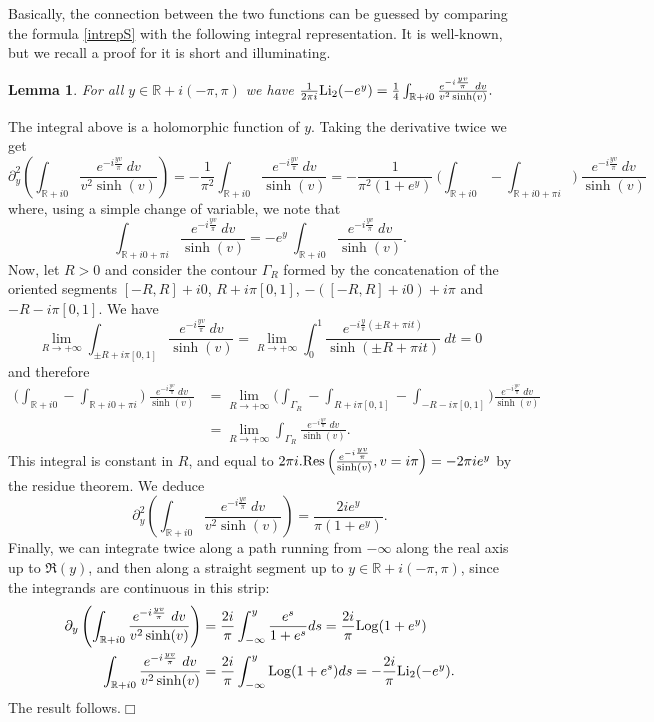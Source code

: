 \documentclass[11pt]{amsart}
\newtheorem{lem}[teo]{Lemma}
\newcommand{\cvd}{\hfill$\Box$}
\newcommand{\mr}{\mathbb{R}}
\newcommand{\Log}{{\rm Log}}
\def\cvd{\hfill$\Box$}
\begin{document}
{\begin{equation}
\end{equation}
Basically, the connection between the two functions can be guessed by comparing the formula \eqref{intrepS} with the following integral representation. It is well-known, but we recall a proof for it is short and illuminating.
\begin{lem}\label{Li2intrep} For all $y\in \mr+i(-\pi,\pi)$ we have $\frac{1}{2\pi i}{\rm Li_2}(-e^y) = \frac{1}{4} \int_{\mr +i0} \frac{e^{-i\frac{yv}{\pi}}\ dv}{v^2\sinh(v)}.$
\end{lem}
\proof The integral above is a holomorphic function of $y$. Taking the derivative twice we get
$$\partial_{y}^2 \left( \int_{\mr +i0} \frac{e^{-i\frac{yv}{\pi}}\ dv}{v^2\sinh(v)}\right)  = -\frac{1}{\pi^2} \int_{\mr +i0} \frac{e^{-i\frac{yv}{\pi}}\ dv}{\sinh(v)} = -\frac{1}{\pi^2 (1+e^{y})}\ \biggl( \int_{\mr +i0} - \int_{\mr +i0+\pi i} \biggr)\ \frac{e^{-i\frac{yv}{\pi}}\ dv}{\sinh(v)}$$
where, using a simple change of variable, we note that
$$\int_{\mr +i0+\pi i} \frac{e^{-i\frac{yv}{\pi}}\ dv}{\sinh(v)} = -e^{y}\ \int_{\mr +i0} \frac{e^{-i\frac{yv}{\pi}}\ dv}{\sinh(v)}.$$
Now, let $R>0$ and consider the contour $\Gamma_R$ formed by the concatenation of the oriented segments $[-R,R]+i0$, $R+i\pi[0,1]$, $-([-R,R]+i0)+i\pi$ and $-R-i\pi [0,1]$. We have
$$\lim_{R \rightarrow +\infty} \int_{\pm R+i\pi[0,1]} \frac{e^{-i\frac{yv}{\pi}}\ dv}{\sinh(v)} = \lim_{R \rightarrow +\infty} \int_0^1 \frac{e^{-i\frac{y}{\pi}(\pm R + \pi it)}}{\sinh(\pm R + \pi it)} \ dt = 0$$
and therefore
\begin{align*}\biggl( \int_{\mr +i0} - \int_{\mr +i0+\pi i} \biggr)\ \frac{e^{-i\frac{yv}{\pi}}\ dv}{\sinh(v)} & = \lim_{R \rightarrow +\infty} \biggl( \int_{\Gamma_R} - \int_{R+i\pi[0,1]} - \int_{-R-i\pi[0,1]}\biggr) \frac{e^{-i\frac{yv}{\pi}}\ dv}{\sinh(v)} \\ & = \lim_{R \rightarrow +\infty} \int_{\Gamma_R} \frac{e^{-i\frac{yv}{\pi}}\ dv}{\sinh(v)}. 
\end{align*}
This integral is constant in $R$, and equal to $\textstyle 2\pi i .{\rm Res}\left( \frac{e^{-i\frac{yv}{\pi}}}{\sinh(v)}, v=i\pi\right) =-2\pi i e^y$ by the residue theorem. We deduce
$$\partial_{y}^2 \left( \int_{\mr +i0} \frac{e^{-i\frac{yv}{\pi}}\ dv}{v^2\sinh(v)}\right) =\frac{2ie^y}{\pi (1+e^{y})}.$$
Finally, we can integrate twice along a path running from $-\infty$ along the real axis up to $\mathfrak{R}(y)$, and then along a straight segment up to $y\in \mr+i(-\pi,\pi)$, since the integrands are continuous in this strip:
\begin{align*}
\partial_{y} \left( \int_{\mr +i0} \frac{e^{-i\frac{yv}{\pi}}\ dv}{v^2\sinh(v)}\right) & =\frac{2i}{\pi} \int_{-\infty}^y \frac{e^s}{1+e^{s}}ds =\frac{2i}{\pi} \Log(1+e^y)\\ \int_{\mr +i0} \frac{e^{-i\frac{yv}{\pi}}\ dv}{v^2\sinh(v)}& = \frac{2i}{\pi} \int_{-\infty}^y \Log(1+e^s) ds = -\frac{2i}{\pi} {\rm Li}_2(-e^y).
\end{align*}
The result follows.\cvd
\medskip

}
\end{document}
